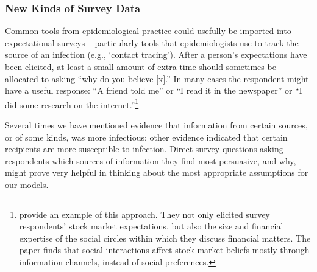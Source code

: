 \subsubsection{New Kinds of Survey Data}
Common tools from epidemiological practice could usefully be imported into expectational surveys -- particularly tools that epidemiologists use to track the source of an infection (e.g., `contact tracing').  After a person's expectations have been elicited, at least a small amount of extra time should sometimes be allocated to asking ``why do you believe [x].''  In many cases the respondent might have a useful response: ``A friend told me'' or ``I read it in the newspaper'' or ``I did some research on the internet.''\footnote{\cite{arrondel2020informative} provide an example of this approach. They not only elicited survey respondents' stock market expectations, but also the size and financial expertise of the social circles within which they discuss financial matters. The paper finds that social interactions affect stock market beliefs mostly through information channels, instead of social  preferences.} %

Several times we have mentioned evidence that information from certain sources, or of some kinds, was more infectious;  other evidence indicated that certain recipients are more susceptible to infection.  %
Direct survey questions asking respondents which sources of information they find most persuasive, and why, might prove very helpful in thinking about the most appropriate assumptions for our models.%

